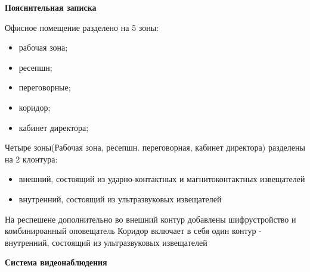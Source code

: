 \documentclass[a4paper,14pt]{extarticle}
\begin{document}
    \textbf{Пояснительная записка}
    \begin{spacing}{1.25}
        Офисное помещение разделено на 5 зоны:
        \vspace{-1ex}
        \begin{spacing}{0.5}
            \begin{itemize}
                \item рабочая зона;
                \item ресепшн;
                \item переговорные; 
                \item коридор;
                \item кабинет директора;
            \end{itemize}
        \end{spacing}
        Четыре зоны(Рабочая зона, ресепшн. переговорная, кабинет директора) разделены на 2 клонтура:
        \begin{spacing}{0.5}
            \begin{itemize}
                \item внешний, состоящий из ударно-контактных и магнитоконтактных извещателей
                \item внутренний, состоящий из ультразвуковых извещателей 
            \end{itemize}
        \end{spacing}
        На респешене дополнительно во внешний контур добавлены шифрустройство и комбинироанный оповещатель
        Коридор включает в себя один контур - внутренний, состоящий из ультразвуковых извещателей
    \end{spacing}
    
    \vspace{3ex}
    \textbf{\large{Система видеонаблюдения}}
\end{document}
